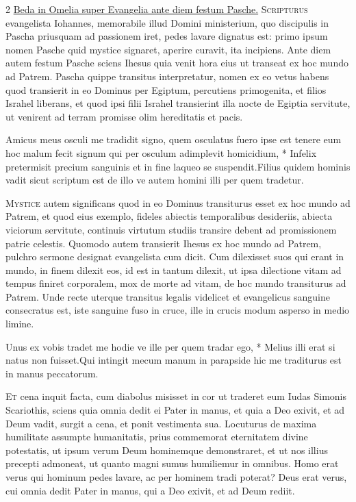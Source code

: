 \begin{multicols*}{2}
\newline \ul{Beda in Omelia super Evangelia ante diem festum Pasche.} \grecross
{}
\lettrine[lines=2]{\zallmancaps \color{Red} S}{cripturus} evangelista Iohannes, memorabile illud Domini ministerium, quo discipulis in Pascha priusquam ad passionem iret, pedes lavare dignatus est: primo ipsum nomen Pasche quid mystice signaret, aperire curavit, ita incipiens. Ante diem autem festum Pasche sciens Ihesus quia venit hora eius ut transeat ex hoc mundo ad Patrem. Pascha quippe transitus interpretatur, nomen ex eo vetus habens quod transierit in eo Dominus per Egiptum, percutiens primogenita, et filios Israhel liberans, et quod ipsi filii Israhel transierint illa nocte de Egiptia servitute, ut venirent ad terram promisse olim hereditatis et pacis.
\begin{responsory}
{Amicus meus osculi me tradidit signo, quem osculatus fuero ipse est tenere eum hoc malum fecit signum qui per osculum adimplevit homicidium, * Infelix pretermisit precium sanguinis et in fine laqueo se suspendit.}{Filius quidem hominis vadit sicut scriptum est de illo ve autem homini illi per quem tradetur.}
\end{responsory}%
\lettrine[lines=2]{\zallmancaps \color{Blue} M}{ystice} autem significans quod in eo Dominus transiturus esset ex hoc mundo ad Patrem, et quod eius exemplo, fideles abiectis temporalibus desideriis, abiecta viciorum servitute, continuis virtutum studiis transire debent ad promissionem patrie celestis. Quomodo autem transierit Ihesus ex hoc mundo ad Patrem, pulchro sermone designat evangelista cum dicit. Cum dilexisset suos qui erant in mundo, in finem dilexit eos, id est in tantum dilexit, ut ipsa dilectione vitam ad tempus finiret corporalem, mox de morte ad vitam, de hoc mundo transiturus ad Patrem. Unde recte uterque transitus legalis videlicet et evangelicus sanguine consecratus est, iste sanguine fuso in cruce, ille in crucis modum asperso in medio limine.
\begin{responsory}
{Unus ex vobis tradet me hodie ve ille per quem tradar ego, * Melius illi erat si natus non fuisset.}{Qui intingit mecum manum in parapside hic me traditurus est in manus peccatorum.}
\end{responsory}%
\lettrine[lines=2]{\zallmancaps \color{Red} E}{t} cena inquit facta, cum diabolus misisset in cor ut traderet eum Iudas Simonis Scariothis, sciens quia omnia dedit ei Pater in manus, et quia a Deo exivit, et ad Deum vadit, surgit a cena, et ponit vestimenta sua. Locuturus de maxima humilitate assumpte humanitatis, prius commemorat eternitatem divine potestatis, ut ipsum verum Deum hominemque demonstraret, et ut nos illius precepti admoneat, ut quanto magni sumus humiliemur in omnibus. Homo erat verus qui hominum pedes lavare, ac per hominem tradi poterat? Deus erat verus, cui omnia dedit Pater in manus, qui a Deo exivit, et ad Deum rediit.

\end{multicols*}
